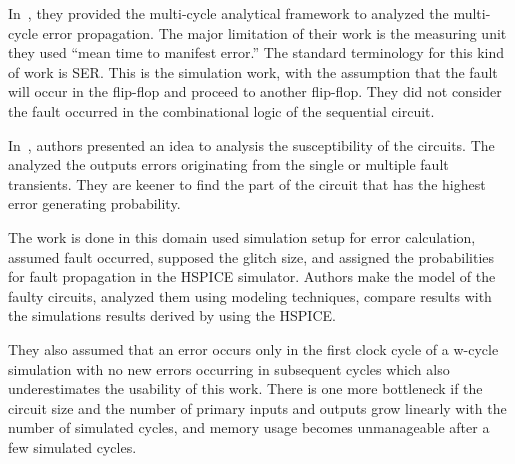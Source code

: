 In~\citep{asadi2005soft}, they provided the multi-cycle analytical framework to analyzed the multi-cycle error
propagation. The major limitation of their work is the measuring unit they used  “mean time
to manifest error.” The standard terminology for this kind of work is SER. This is the simulation work,
with the assumption that the fault will occur in the flip-flop and proceed to another flip-flop. They did not
consider the fault occurred in the combinational logic of the sequential circuit.

In~\citep{miskov2010multiple}, authors presented an idea to analysis the susceptibility of the circuits. The analyzed the outputs
errors originating from the single or multiple fault transients. They are keener to find the part of
the circuit that has the highest error generating probability.







The work is done in this domain used simulation setup for error calculation, assumed fault occurred, supposed the glitch size, and assigned the
probabilities for fault propagation in the HSPICE simulator. Authors make the model of the faulty circuits, analyzed them using modeling techniques, compare results with the simulations results derived by using the
HSPICE. 

They also assumed that an error occurs only in the first clock cycle of a w-cycle simulation with
no new errors occurring in subsequent cycles which also underestimates the usability of this work.  There is one more bottleneck if the circuit size and the number of primary
inputs and outputs grow linearly with the number of simulated cycles, and memory usage becomes
unmanageable after a few simulated cycles.










\label{related}





